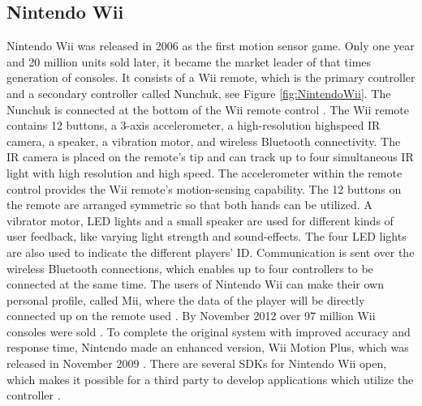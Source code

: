 \subsection{Nintendo Wii}
Nintendo Wii was released in 2006 as the first motion sensor game. Only one year and 20 million units sold later, it became the market leader of that times generation of consoles. It consists of a Wii remote, which is the primary controller and a secondary controller called Nunchuk, see Figure \ref{fig:NintendoWii}. The Nunchuk is connected at the bottom of the Wii remote control \cite{hackingwii}. The Wii remote contains 12 buttons, a 3-axis accelerometer, a high-resolution highspeed IR camera, a speaker, a vibration motor, and wireless Bluetooth connectivity.
The IR camera is placed on the remote's tip and can track up to four simultaneous IR light with high resolution and high speed. The accelerometer within the remote control provides the Wii remote’s motion-sensing capability. The 12 buttons on the remote are arranged symmetric so that both hands can be utilized. A vibrator motor, LED lights and a small speaker are used for different kinds of user feedback, like varying light strength and sound-effects. The four LED lights are also used to indicate the different players' ID. Communication is sent over the wireless Bluetooth connections, which enables up to four controllers to be connected at the same time.  The users of Nintendo Wii can make their own personal profile, called Mii, where the data of the player will be directly connected up on the remote used  \cite{hackingwii} \cite{whatiswii}. By November 2012 over 97 million Wii consoles were sold \cite{vgchartzhardware}.  To complete the original system with improved accuracy and response time, Nintendo made an enhanced version, Wii Motion Plus, which was released in November 2009 \cite{consoles}. There are several SDKs for Nintendo Wii open, which makes it possible for a third party to develop applications which utilize the controller \cite{comparison}. 
